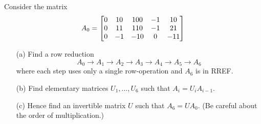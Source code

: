 \documentclass[a4paper]{amsart}
\begin{document}
\begin{exercise}\label{ex-elementary-i}
 Consider the matrix
 \[ A_0 = \left[\begin{matrix} 0 & 10 & 100 & -1 &  10 \\
               0 & 11 & 110 & -1 &  21 \\
               0 & -1 & -10 &  0 & -11
          \end{matrix}\right]
 \]
 \begin{itemize}
  \item[(a)] Find a row reduction 
   \[ A_0 \to A_1 \to A_2 \to A_3 \to A_4 \to A_5 \to A_6 \]
   where each step uses only a single row-operation and $A_6$ is in
   RREF.
  \item[(b)] Find elementary matrices $U_1,\dotsc,U_6$ such that
   $A_i=U_iA_{i-1}$.
  \item[(c)] Hence find an invertible matrix $U$ such that
   $A_6=UA_0$.  (Be careful about the order of multiplication.)
 \end{itemize}
\end{exercise}
\end{document}
